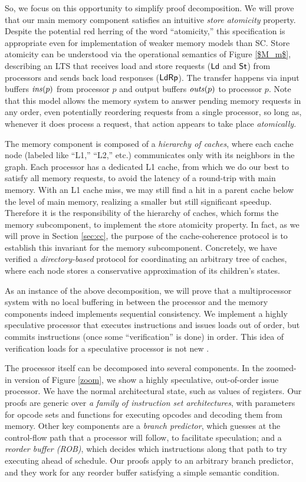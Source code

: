 So, we focus on this opportunity to simplify proof decomposition.  We will
prove that our main memory component satisfies an intuitive \emph{store
atomicity} property.  Despite the potential red herring of the word
``atomicity,'' this specification is appropriate even for implementation of
weaker memory models than SC.  Store atomicity can be understood via the
operational semantics of Figure \ref{$M_m$}, describing an LTS that receives
load and store requests ($\mathsf{Ld}$ and $\mathsf{St}$) from processors and sends back load
responses ($\mathsf{Ld}\mathsf{Rp}$). The transfer happens via input buffers $\mathit{ins}(p)$ from
processor $p$ and output buffers $\mathit{outs}(p)$ to processor $p$.  Note that this
model allows the memory system to answer pending memory requests in any order,
even potentially reordering requests from a single processor,
so long as, whenever it does process a request, that action appears to take
place \emph{atomically}.

The memory component is composed of a \emph{hierarchy of caches}, where each
cache node (labeled like ``L1,'' ``L2,'' etc.) communicates only with its
neighbors in the graph.  Each processor has a dedicated L1 cache, from which we
do our best to satisfy all memory requests, to avoid the latency of a
round-trip with main memory.  With an L1 cache miss, we may still find a hit in
a parent cache below the level of main memory, realizing a smaller but still
significant speedup.  Therefore it is the responsibility of the hierarchy of
caches, which forms the memory subcomponent, to implement the store atomicity
property. In fact, as we will prove in Section \ref{sec:cc}, the purpose of the
cache-coherence protocol is to establish this invariant for the memory
subcomponent.  Concretely, we have verified a \emph{directory-based} protocol
for coordinating an arbitrary tree of caches, where each node stores a
conservative approximation of its children's states.

As an instance of the above decomposition, we will prove that a multiprocessor
system with no local buffering in between the processor and the memory
components indeed implements sequential consistency. We implement a highly
speculative processor that executes instructions and issues loads out of order,
but commits instructions (once some ``verification'' is done) in order. This idea
of verification loads for a speculative processor is not new \cite{cain}.

The processor itself can be decomposed into several components. In the
zoomed-in version of Figure \ref{zoom}, we show a highly speculative,
out-of-order issue processor. We have the normal architectural state, such as
values of registers.  Our proofs are generic over \emph{a family of instruction
set architectures}, with parameters for opcode sets and functions for executing
opcodes and decoding them from memory.  Other key components are a \emph{branch
predictor}, which guesses at the control-flow path that a processor will
follow, to facilitate speculation; and a \emph{reorder buffer (ROB)}, which
decides which instructions along that path to try executing ahead of schedule.
Our proofs apply to an arbitrary branch predictor, and they work for any
reorder buffer satisfying a simple semantic condition.


